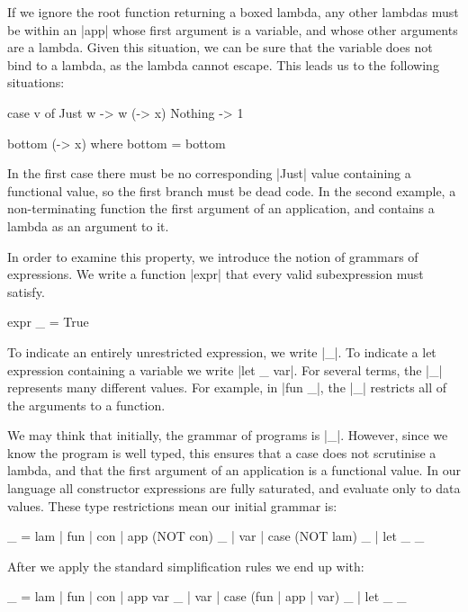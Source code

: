 \documentclass[preprint]{sigplanconf}
\begin{document}
If we ignore the root function returning a boxed lambda, any other lambdas must be within an  |app| whose first argument is a variable, and whose other arguments are a lambda. Given this situation, we can be sure that the variable does not bind to a lambda, as the lambda cannot escape. This leads us to the following situations:

\begin{code}
case v of
    Just w -> w (\x -> x)
    Nothing -> 1

bottom (\x -> x)
    where bottom = bottom
\end{code}

In the first case there must be no corresponding |Just| value containing a functional value, so the first branch must be dead code. In the second example, a non-terminating function the first argument of an application, and contains a lambda as an argument to it.




In order to examine this property, we introduce the notion of grammars of expressions. We write a function |expr| that every valid subexpression must satisfy.

\begin{code}
expr _ = True
\end{code}

To indicate an entirely unrestricted expression, we write |_|. To indicate a let expression containing a variable we write |let _ var|. For several terms, the |_| represents many different values. For example, in |fun _|, the |_| restricts all of the arguments to a function.

We may think that initially, the grammar of programs is |_|. However, since we know the program is well typed, this ensures that a case does not scrutinise a lambda, and that the first argument of an application is a functional value. In our language all constructor expressions are fully saturated, and evaluate only to data values. These type restrictions mean our initial grammar is:

\begin{code}
_ = lam | fun | con | app (NOT con)  _ | var | case (NOT lam) _ | let _ _
\end{code}

After we apply the standard simplification rules we end up with:

\begin{code}
_ = lam | fun | con | app var  _ | var | case (fun | app | var) _ | let _ _
\end{code}
\end{document}
